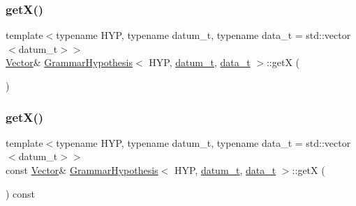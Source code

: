\mbox{\label{class_grammar_hypothesis_aaf8a752657674c7b3b494f3422e7bfc1}} 
\subsubsection{\texorpdfstring{get\+X()}{getX()}\hspace{0.1cm}{\footnotesize\ttfamily [1/2]}}
{\footnotesize\ttfamily template$<$typename H\+YP, typename datum\+\_\+t, typename data\+\_\+t = std\+::vector$<$datum\+\_\+t$>$$>$ \\
\hyperlink{_eigen_numerics_8h_aca2956bc379bce2ed88ab3c0e1b61d1d}{Vector}\& \hyperlink{class_grammar_hypothesis}{Grammar\+Hypothesis}$<$ H\+YP, \hyperlink{class_bayesable_a9f1a6c0cd7855550fa10b1a8f13a5867}{datum\+\_\+t}, \hyperlink{class_bayesable_aa2788c4d7718c0a824e1d28c4c98f921}{data\+\_\+t} $>$\+::getX (\begin{DoxyParamCaption}{ }\end{DoxyParamCaption})\hspace{0.3cm}{\ttfamily [inline]}}

\mbox{\label{class_grammar_hypothesis_a6206300d969df15d9d38a899e5123387}} 
\subsubsection{\texorpdfstring{get\+X()}{getX()}\hspace{0.1cm}{\footnotesize\ttfamily [2/2]}}
{\footnotesize\ttfamily template$<$typename H\+YP, typename datum\+\_\+t, typename data\+\_\+t = std\+::vector$<$datum\+\_\+t$>$$>$ \\
const \hyperlink{_eigen_numerics_8h_aca2956bc379bce2ed88ab3c0e1b61d1d}{Vector}\& \hyperlink{class_grammar_hypothesis}{Grammar\+Hypothesis}$<$ H\+YP, \hyperlink{class_bayesable_a9f1a6c0cd7855550fa10b1a8f13a5867}{datum\+\_\+t}, \hyperlink{class_bayesable_aa2788c4d7718c0a824e1d28c4c98f921}{data\+\_\+t} $>$\+::getX (\begin{DoxyParamCaption}{ }\end{DoxyParamCaption}) const\hspace{0.3cm}{\ttfamily [inline]}}

